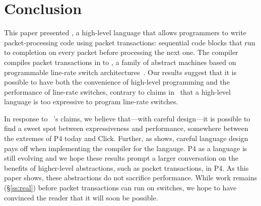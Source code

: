 \section{Conclusion}
\label{s:conclusion}

This paper presented \pktlanguage, a high-level language that allows
programmers to write packet-processing code using packet transactions:
sequential code blocks that run to completion on every packet before processing
the next one. The \pktlanguage compiler compiles packet transactions in
\pktlanguage to \absmachine, a family of abstract machines based on
programmable line-rate switch architectures~\cite{flexpipe, xpliant, rmt}. Our
results suggest that it is possible to have both the convenience of high-level
programming and the performance of line-rate switches, contrary to claims
in~\cite{p4} that a high-level language is too expressive to program line-rate
switches.

In response to ~\cite{p4}'s claims, we believe that---with careful design---it
is possible to find a sweet spot between expressiveness and performance,
somewhere between the extremes of P4 today and Click. Further, as \pktlanguage
shows, careful language design pays off when implementing the compiler for the
langauge. P4 as a language is still evolving and we hope these results prompt a
larger conversation on the benefits of higher-level abstractions, such as
packet transactions, in P4. As this paper shows, these abstractions do not
sacrifice performance. While work remains (\S\ref{ss:real}) before packet
transactions can run on switches, we hope to have convinced the reader that it
will soon be possible.
